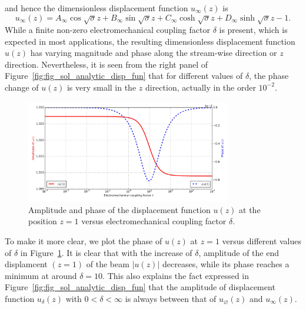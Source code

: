 \documentclass{article}
\begin{document}
and hence the dimensionless displacement function $u_{\infty} (z)$ is
\begin{equation}
    u_{\infty} (z) = A_{\infty} \cos{\sqrt{\sigma}z} + B_{\infty} \sin{\sqrt{\sigma}z} + C_{\infty} \cosh{\sqrt{\sigma}z} + D_{\infty} \sinh{\sqrt{\sigma}z} - 1.
\end{equation}
While a finite non-zero electromechanical coupling factor $\delta$ is present, which is expected in most applications, the resulting dimensionless displacement function $u(z)$ has varying magnitude and phase along the stream-wise direction or $z$ direction. Nevertheless, it is seen from the right panel of Figure~\ref{fig:fig_sol_analytic_disp_fun} that for different values of $\delta$, the phase change of $u(z)$ is very small in the $z$ direction, actually in the order $10^{-2}$. 


\begin{figure}[!htbp]
    \centering
    \includegraphics[width=0.8\textwidth]{./img_eig_asy/fig_sol_analytic_disp_end.jpg}
    \caption{Amplitude and phase of the displacement function $u(z)$ at the position $z=1$ versus electromechanical coupling factor $\delta$. }
    \label{fig:fig_sol_analytic_disp_end}
\end{figure}


To make it more clear, we plot the phase of $u(z)$ at $z=1$ versus different values of $\delta$ in Figure~\ref{fig:fig_sol_analytic_disp_end}. It is clear that with the increase of $\delta$, amplitude of the end displamcent $(z=1)$ of the beam $|u(z)|$ decreases, while its phase reaches a minimum at around $\delta = 10$. This also explains the fact expressed in Figure~\ref{fig:fig_sol_analytic_disp_fun} that the amplitude of displacement function $u_\delta (z)$ with $0 < \delta < \infty$ is always between that of $u_\varnothing (z)$ and $u_\infty (z)$.
\end{document}
